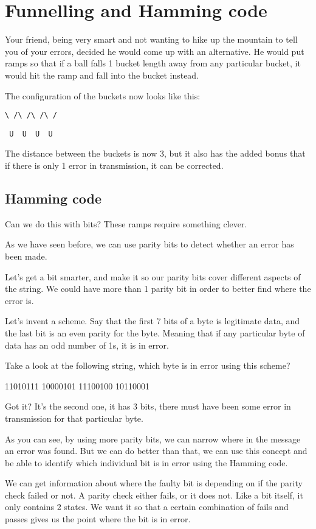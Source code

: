 \documentclass{article}
\begin{document}
  \section*{Funnelling and Hamming code}

  Your friend, being very smart and not wanting to hike up the mountain to tell you of your errors, decided he would come up with an alternative. He would put ramps so that if a ball falls 1 bucket length away from any particular bucket, it would hit the ramp and fall into the bucket instead.

  The configuration of the buckets now looks like this:

  \texttt{\textbackslash\ /\textbackslash\ /\textbackslash\ /\textbackslash\ /}

  \texttt{\ U\ \ U\ \ U\ \ U}

  The distance between the buckets is now 3, but it also has the added bonus that if there is only 1 error in transmission, it can be corrected.

  \subsection*{Hamming code}
  Can we do this with bits? These ramps require something clever.

  As we have seen before, we can use parity bits to detect whether an error has been made.

  Let's get a bit smarter, and make it so our parity bits cover different aspects of the string. We could have more than 1 parity bit in order to better find where the error is.

  Let's invent a scheme. Say that the first 7 bits of a byte is legitimate data, and the last bit is an even parity for the byte. Meaning that if any particular byte of data has an odd number of 1s, it is in error.

  Take a look at the following string, which byte is in error using this scheme?

  11010111 10000101 11100100  10110001

  Got it? It's the second one, it has 3 bits, there must have been some error in transmission for that particular byte.

  As you can see, by using more parity bits, we can narrow where in the message an error was found. But we can do better than that, we can use this concept and be able to identify which individual bit is in error using the Hamming code.

  We can get information about where the faulty bit is depending on if the parity check failed or not. A parity check either fails, or it does not. Like a bit itself, it only contains 2 states. We want it so that a certain combination of fails and passes gives us the point where the bit is in error.
\end{document}
